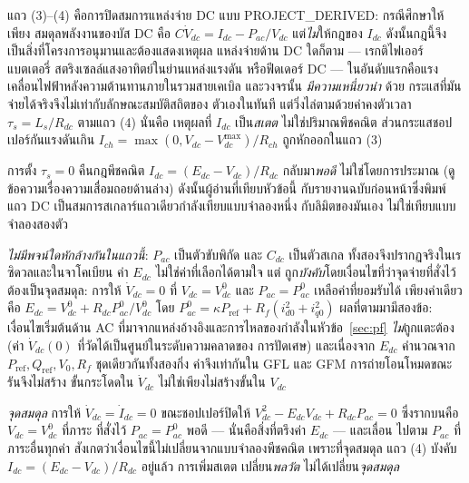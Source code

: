\documentclass[12pt,a4paper]{article}
\begin{document}
แถว (3)--(4) คือการปิดสมการแหล่งจ่าย DC แบบ \textsf{PROJECT\_DERIVED}: กรณีศึกษาให้เพียง
สมดุลพลังงานของบัส DC คือ $C\dot V_{dc}=I_{dc}-P_{ac}/V_{dc}$ แต่\emph{ไม่}ให้กฎของ
$I_{dc}$ ดังนั้นกฎนี้จึงเป็นสิ่งที่โครงการอนุมานและต้องแสดงเหตุผล แหล่งจ่ายด้าน DC
ใดก็ตาม --- เรกติไฟเออร์ แบตเตอรี่ สตริงเซลล์แสงอาทิตย์ในย่านแหล่งแรงดัน หรือฟีดเดอร์
DC --- ในอันดับแรกคือแรงเคลื่อนไฟฟ้าหลังความต้านทานภายในรวมสายเคเบิล และวงจรนั้น
\emph{มีความเหนี่ยวนำ} ด้วย กระแสที่มันจ่ายได้จริงจึงไม่เท่ากับลักษณะสมบัติสถิตของ
ตัวเองในทันที แต่วิ่งไล่ตามด้วยค่าคงตัวเวลา $\tau_s=L_s/R_{dc}$ ตามแถว (4) นั่นคือ
เหตุผลที่ $I_{dc}$ เป็น\emph{สเตต} ไม่ใช่ปริมาณพีชคณิต ส่วนกระแสชอปเปอร์กันแรงดันเกิน
$I_{ch}=\max(0,V_{dc}-V_{dc}^{\max})/R_{ch}$ ถูกหักออกในแถว (3)

การตั้ง $\tau_s=0$ คืนกฎพีชคณิต $I_{dc}=(E_{dc}-V_{dc})/R_{dc}$ กลับมา\emph{พอดี}
ไม่ใช่โดยการประมาณ (ดูข้อความเรื่องความเสื่อมถอยด้านล่าง) ดังนั้นผู้อ่านที่เทียบหัวข้อนี้
กับรายงานฉบับก่อนหน้าซึ่งพิมพ์แถว DC เป็นสมการสเกลาร์แถวเดียวกำลังเทียบแบบจำลองหนึ่ง
กับลิมิตของมันเอง ไม่ใช่เทียบแบบจำลองสองตัว

\emph{ไม่มีพจน์ใดหักล้างกันในแถวนี้}: $P_{ac}$ เป็นตัวขับพิกัด และ $C_{dc}$ เป็นตัวสเกล
ทั้งสองจึงปรากฏจริงในเรซิดวลและในจาโคเบียน ค่า $E_{dc}$ ไม่ใช่ค่าที่เลือกได้ตามใจ แต่
ถูก\emph{บังคับ}โดยเงื่อนไขที่ว่าจุดจ่ายที่สั่งไว้ต้องเป็นจุดสมดุล: การให้
$\dot V_{dc}=0$ ที่ $V_{dc}=V_{dc}^{0}$ และ $P_{ac}=P_{ac}^{0}$ เหลือค่าที่ยอมรับได้
เพียงค่าเดียวคือ $E_{dc}=V_{dc}^{0}+R_{dc}P_{ac}^{0}/V_{dc}^{0}$ โดย
$P_{ac}^{0}=\kappa P_{\mathrm{ref}}+R_f(i_{d0}^{2}+i_{q0}^{2})$ ผลที่ตามมามีสองข้อ:
เงื่อนไขเริ่มต้นด้าน AC ที่มาจากแหล่งอ้างอิงและการไหลของกำลังในหัวข้อ~\ref{sec:pf}
\emph{ไม่}ถูกแตะต้อง (ค่า $\dot V_{dc}(0)$ ที่วัดได้เป็นศูนย์ในระดับความคลาดของ
การปัดเศษ) และเนื่องจาก $E_{dc}$ คำนวณจาก $P_{\mathrm{ref}},Q_{\mathrm{ref}},V_0,R_f$
ชุดเดียวกันทั้งสองกิ่ง ค่าจึงเท่ากันใน GFL และ GFM การถ่ายโอนโหมดขณะรันจึงไม่สร้าง
ขั้นกระโดดใน $\dot V_{dc}$ ไม่ใช่เพียงไม่สร้างขั้นใน $V_{dc}$

\emph{จุดสมดุล} การให้ $\dot V_{dc}=\dot I_{dc}=0$ ขณะชอปเปอร์ปิดให้
$V_{dc}^{2}-E_{dc}V_{dc}+R_{dc}P_{ac}=0$ ซึ่งรากบนคือ $V_{dc}=V_{dc}^{0}$ ที่ภาระ
ที่สั่งไว้ $P_{ac}=P_{ac}^{0}$ พอดี --- นั่นคือสิ่งที่ตรึงค่า $E_{dc}$ --- และเลื่อน
ไปตาม $P_{ac}$ ที่ภาระอื่นทุกค่า สังเกตว่าเงื่อนไขนี้ไม่เปลี่ยนจากแบบจำลองพีชคณิต
เพราะที่จุดสมดุล แถว (4) บังคับ $I_{dc}=(E_{dc}-V_{dc})/R_{dc}$ อยู่แล้ว การเพิ่มสเตต
เปลี่ยน\emph{พลวัต} ไม่ได้เปลี่ยน\emph{จุดสมดุล}
\end{document}
